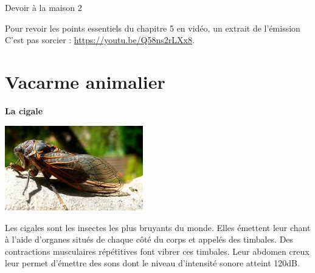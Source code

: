 \documentclass[12pt,a4paper]{article}
\begin{document}
\begin{header}
Devoir à la maison 2
\end{header}

Pour revoir les points essentiels du chapitre 5 en vidéo, un extrait de l'émission C'est pas sorcier : \href{https://youtu.be/Q58ns2rLXx8}{https://youtu.be/Q58ns2rLXx8}.

\section*{Vacarme animalier}

\begin{doc}
\textbf{La cigale}
\vspace{-\baselineskip}
\begin{multicols}{2}
\begin{center}
\includegraphics[width=0.45\textwidth]{images/cigale.jpg}
\end{center}

Les cigales sont les insectes les plus bruyants du monde.
Elles émettent leur chant à l'aide d'organes situés de chaque côté du corps et appelés des timbales.
Des contractions musculaires répétitives font vibrer ces timbales.
Leur abdomen creux leur permet d'émettre des sons dont le niveau d'intensité sonore atteint \unit{120}{dB}.
\end{multicols}
\end{doc}
\end{document}
